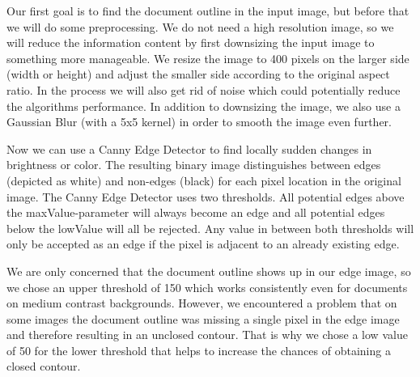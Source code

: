 \documentclass[bibliography=totoc]{scrartcl}
\begin{document}
	Our first goal is to find the document outline in the input image, but before that we will do some preprocessing.
	We do not need a high resolution image, so we will reduce the information content by first downsizing the input image to something more manageable.
	We resize the image to 400 pixels on the larger side (width or height) and adjust the smaller side according to the original aspect ratio.
	In the process we will also get rid of noise which could potentially reduce the algorithms performance.
	In addition to downsizing the image, we also use a Gaussian Blur (with a 5x5 kernel) in order to smooth the image even further.

	Now we can use a Canny Edge Detector to find locally sudden changes in brightness or color. 
	The resulting binary image distinguishes between edges (depicted as white) and non-edges (black) for each pixel location in the original image.
	The Canny Edge Detector uses two thresholds. 
	All potential edges above the maxValue-parameter will always become an edge and all potential edges below the lowValue will all be rejected.
	Any value in between both thresholds will only be accepted as an edge if the pixel is adjacent to an already existing edge. \cite{Canny}
	
	We are only concerned that the document outline shows up in our edge image, so we chose an upper threshold of 150 which works consistently even for documents on medium contrast backgrounds. 
	However, we encountered a problem that on some images the document outline was missing a single pixel in the edge image and therefore resulting in an unclosed contour.
	That is why we chose a low value of 50 for the lower threshold that helps to increase the chances of obtaining a closed contour.\\
	
\end{document}
